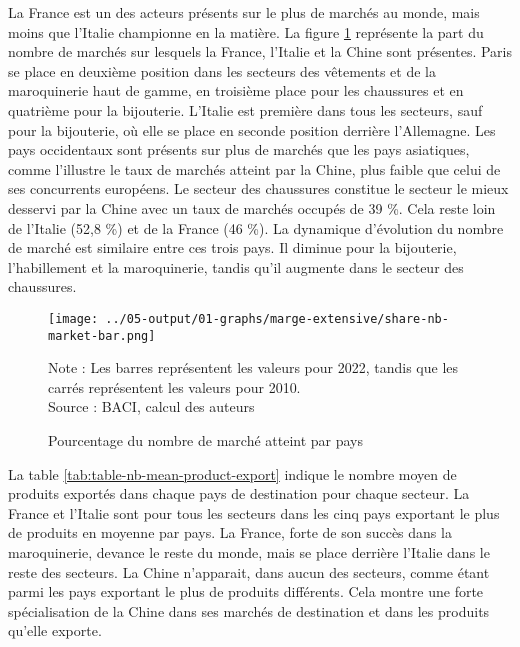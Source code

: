 \documentclass[french,10pt,a4paper]{article}
\begin{document}
La France est un des acteurs présents sur le plus de marchés au monde, mais moins que l'Italie championne en la matière. La figure \ref{fig:nb-market-bar} représente la part du nombre de marchés sur lesquels la France, l'Italie et la Chine sont présentes. Paris se place en deuxième position dans les secteurs des vêtements et de la maroquinerie haut de gamme, en troisième place pour les chaussures et en quatrième pour la bijouterie. L'Italie est première dans tous les secteurs, sauf pour la bijouterie, où elle se place en seconde position derrière l'Allemagne. Les pays occidentaux sont présents sur plus de marchés que les pays asiatiques, comme l'illustre le taux de marchés atteint par la Chine, plus faible que celui de ses concurrents européens. Le secteur des chaussures constitue le secteur le mieux desservi par la Chine avec un taux de marchés occupés de 39 \%. Cela reste loin de l'Italie (52,8 \%) et de la France (46 \%). La dynamique d'évolution du nombre de marché est similaire entre ces trois pays. Il diminue pour la bijouterie, l'habillement et la maroquinerie, tandis qu'il augmente dans le secteur des chaussures.

\begin{figure}[!h]
  \centering
  \texttt{[image: ../05-output/01-graphs/marge-extensive/share-nb-market-bar.png]}
  \captionsetup{justification=justified, singlelinecheck=false, font=small}
  \caption*{Note : Les barres représentent les valeurs pour 2022, tandis que les carrés représentent les valeurs pour 2010. \\
  Source : BACI, calcul des auteurs}
  \captionsetup{justification=centering, singlelinecheck=true, font=normalsize}
  \caption{Pourcentage du nombre de marché atteint par pays}
  \label{fig:nb-market-bar}
\end{figure}

La table \ref{tab:table-nb-mean-product-export} indique le nombre moyen de produits exportés dans chaque pays de destination pour chaque secteur. La France et l'Italie sont pour tous les secteurs dans les cinq pays exportant le plus de produits en moyenne par pays. La France, forte de son succès dans la maroquinerie, devance le reste du monde, mais se place derrière l'Italie dans le reste des secteurs. La Chine n'apparait, dans aucun des secteurs, comme étant parmi les pays exportant le plus de produits différents. Cela montre une forte spécialisation de la Chine dans ses marchés de destination et dans les produits qu'elle exporte. 
\end{document}
